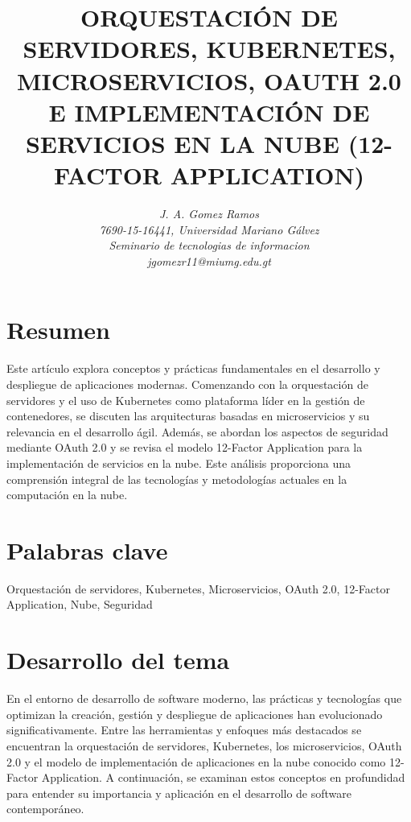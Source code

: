 \documentclass[12pt]{article}
\begin{document}
\title{\textbf{ORQUESTACIÓN DE SERVIDORES, KUBERNETES, MICROSERVICIOS, OAUTH 2.0 E IMPLEMENTACIÓN DE SERVICIOS EN LA NUBE (12-FACTOR APPLICATION)}}
\author{\textit{J. A. Gomez Ramos}\\
\textit{7690-15-16441, Universidad Mariano Gálvez}\\
\textit{Seminario de tecnologias de informacion}\\
\textit{jgomezr11@miumg.edu.gt}}
\date{}
\maketitle

\section*{Resumen}
Este artículo explora conceptos y prácticas fundamentales en el desarrollo y despliegue de aplicaciones modernas. Comenzando con la orquestación de servidores y el uso de Kubernetes como plataforma líder en la gestión de contenedores, se discuten las arquitecturas basadas en microservicios y su relevancia en el desarrollo ágil. Además, se abordan los aspectos de seguridad mediante OAuth 2.0 y se revisa el modelo 12-Factor Application para la implementación de servicios en la nube. Este análisis proporciona una comprensión integral de las tecnologías y metodologías actuales en la computación en la nube.

\section*{Palabras clave}
Orquestación de servidores, Kubernetes, Microservicios, OAuth 2.0, 12-Factor Application, Nube, Seguridad

\section*{Desarrollo del tema}

En el entorno de desarrollo de software moderno, las prácticas y tecnologías que optimizan la creación, gestión y despliegue de aplicaciones han evolucionado significativamente. Entre las herramientas y enfoques más destacados se encuentran la orquestación de servidores, Kubernetes, los microservicios, OAuth 2.0 y el modelo de implementación de aplicaciones en la nube conocido como 12-Factor Application. A continuación, se examinan estos conceptos en profundidad para entender su importancia y aplicación en el desarrollo de software contemporáneo.
\end{document}
